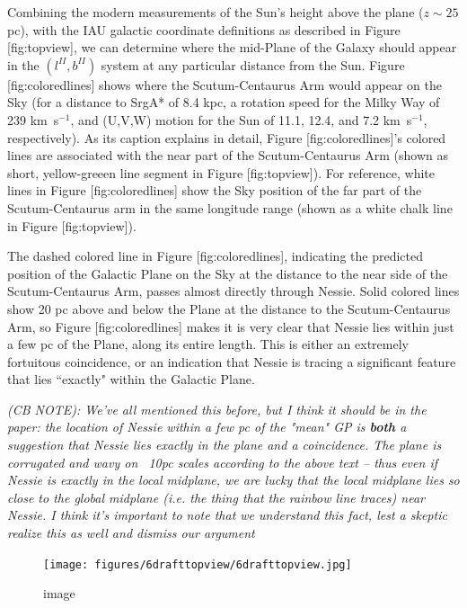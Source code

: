 \documentclass[]{article}
\begin{document}
Combining the modern measurements of the Sun's height above the plane
($z\sim 25$ pc), with the IAU galactic coordinate definitions as
described in Figure {[}fig:topview{]}, we can determine where the
mid-Plane of the Galaxy should appear in the $(l^{II}, b^{II})$ system
at any particular distance from the Sun. Figure {[}fig:coloredlines{]}
shows where the Scutum-Centaurus Arm would appear on the Sky (for a
distance to SrgA* of 8.4 kpc, a rotation speed for the Milky Way of 239
km~s$^{-1}$, and (U,V,W) motion for the Sun of 11.1, 12.4, and 7.2
km~s$^{-1}$, respectively). As its caption explains in detail, Figure
{[}fig:coloredlines{]}'s colored lines are associated with the near part
of the Scutum-Centaurus Arm (shown as short, yellow-greeen line segment
in Figure {[}fig:topview{]}). For reference, white lines in Figure
{[}fig:coloredlines{]} show the Sky position of the far part of the
Scutum-Centaurus arm in the same longitude range (shown as a white chalk
line in Figure {[}fig:topview{]}).

The dashed colored line in Figure {[}fig:coloredlines{]}, indicating the
predicted position of the Galactic Plane on the Sky at the distance to
the near side of the Scutum-Centaurus Arm, passes almost directly
through Nessie. Solid colored lines show 20 pc above and below the Plane
at the distance to the Scutum-Centaurus Arm, so Figure
{[}fig:coloredlines{]} makes it is very clear that Nessie lies within
just a few pc of the Plane, along its entire length. This is either an
extremely fortuitous coincidence, or an indication that Nessie is
tracing a significant feature that lies ``exactly" within the Galactic
Plane.

\emph{(CB NOTE): We've all mentioned this before, but I think it should
be in the paper: the location of Nessie within a few pc of the "mean" GP
is \textbf{both} a suggestion that Nessie lies exactly in the plane and
a coincidence. The plane is corrugated and wavy on ~10pc scales
according to the above text -- thus even if Nessie is exactly in the
local midplane, we are lucky that the local midplane lies so close to
the global midplane (i.e. the thing that the rainbow line traces) near
Nessie. I think it's important to note that we understand this fact,
lest a skeptic realize this as well and dismiss our argument}

\begin{figure}[htbp]
\centering
\texttt{[image: figures/6drafttopview/6drafttopview.jpg]}
\caption{image}
\end{figure}
\end{document}
